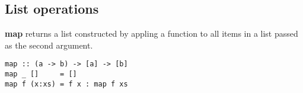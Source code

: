 %

\subsection{List operations}

\textbf{map} returns a list constructed by appling a function to all items in a list passed as the second argument.
\begin{verbatim}
map :: (a -> b) -> [a] -> [b]
map _ []     = []
map f (x:xs) = f x : map f xs
\end{verbatim}

%